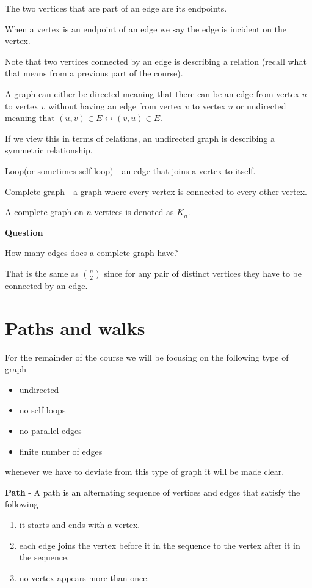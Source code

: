 \documentclass[12pt]{article}
\begin{document}
The two vertices that are part of an edge are its endpoints.

When a vertex is an endpoint of an edge we say the edge is incident on the vertex.

Note that two vertices connected by an edge is describing a relation (recall what that means from a previous part of the course).

A graph can either be directed meaning that there can be an edge from vertex $u$ to vertex $v$ without having an edge from vertex $v$ to vertex $u$ or undirected meaning that $(u,v) \in E \leftrightarrow (v,u) \in E$.

If we view this in terms of relations, an undirected graph is describing a symmetric relationship.

Loop(or sometimes self-loop) - an edge that joins a vertex to itself.

Complete graph - a graph where every vertex is connected to every other vertex.

A complete graph on $n$ vertices is denoted as $K_n$.

\medskip

\textbf{Question}

How many edges does a complete graph have?

\medskip

That is the same as $\binom{n}{2}$ since for any pair of distinct vertices they have to be connected by an edge.

\section*{Paths and walks}

For the remainder of the course we will be focusing on the following type of graph

\begin{itemize}
\item undirected
\item no self loops
\item no parallel edges
\item finite number of edges
\end{itemize}

whenever we have to deviate from this type of graph it will be made clear.


\textbf{Path} - A path is an alternating sequence of vertices and edges that satisfy the following 

\begin{enumerate}


\item it starts and ends with a vertex.
\item each edge joins the vertex before it in the sequence to the vertex after it in the sequence.
\item no vertex appears more than once.
\end{enumerate}
\end{document}
